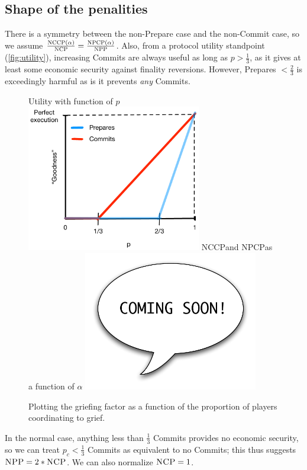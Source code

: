 \documentclass[12pt, final]{article}
\newcommand{\NCP}{\textsc{NCP}\space}
\newcommand{\NCCP}{\textsc{NCCP}\space}
\newcommand{\NPP}{\textsc{NPP}\space}
\newcommand{\NPCP}{\textsc{NPCP}\space}
\begin{document}
\subsection{Shape of the penalities}
There is a symmetry between the non-Prepare case and the non-Commit case, so we assume $\frac{\NCCP(\alpha)}{\NCP} = \frac{\NPCP(\alpha)}{\NPP}$. Also, from a protocol utility standpoint (\ref{fig:utility}), increasing Commits are always useful as long as $p > \frac{1}{3}$, as it gives at least some economic security against finality reversions.  However, Prepares $< \frac{2}{3}$ is exceedingly harmful as is it prevents \emph{any} Commits.



\begin{figure}[h!bt]
	\centering

	Utility with function of $p${ 	\includegraphics[width=3in]{goodness-with-p.pdf} \label{fig:utility} }
	\NCCP and \NPCP as a function of $\alpha${ 	\includegraphics[width=3in]{cs.pdf} \label{fig:collectivepenalties} }
	
	\caption{Plotting the griefing factor as a function of the proportion of players coordinating to grief.}
	\label{fig:GF}
\end{figure}


In the normal case, anything less than $\frac{1}{3}$ Commits provides no economic security, so we can treat $p_c < \frac{1}{3}$ Commits as equivalent to no Commits; this thus suggests $\NPP = 2 * \NCP$. We can also normalize $\NCP = 1$.
\end{document}
